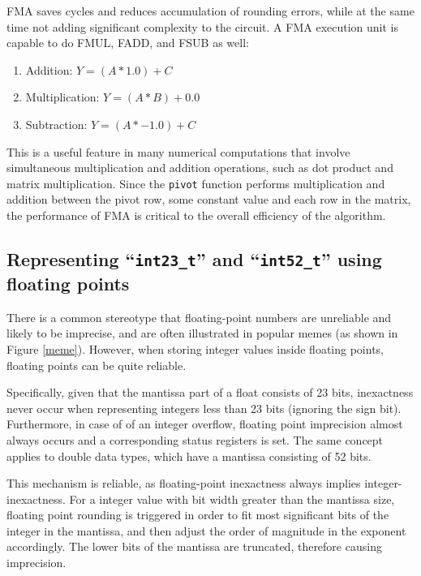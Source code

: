 \documentclass[logo,bsc,singlespacing,parskip]{infthesis}
\newcommand{\pivot}{\texttt{pivot}}
\newenvironment{compactlist}
{ \begin{enumerate}
    \setlength{\itemsep}{0pt}
    \setlength{\parskip}{0pt}
    \setlength{\parsep}{0pt}     
}
{ \end{enumerate} }
\begin{document}
FMA saves cycles and reduces accumulation of rounding errors, while at the same
time not adding significant complexity to the circuit. A FMA execution unit is
capable to do FMUL, FADD, and FSUB as well: 
\begin{compactlist} 
\item[] Addition: \begin{math}Y = (A * 1.0) + C \end{math} 
\item[] Multiplication: \begin{math} Y = (A * B) + 0.0 \end{math} 
\item[] Subtraction: \begin{math} Y = (A * -1.0) + C\end{math} 
\end{compactlist} 

This is a useful feature in many numerical computations that involve
simultaneous multiplication and addition operations, such as dot product and
matrix multiplication. Since the \pivot{} function performs multiplication and
addition between the pivot row, some constant value and each row in the matrix,
the performance of FMA is critical to the overall efficiency of the algorithm. 

\subsection{Representing ``\texttt{int23\_t}'' and ``\texttt{int52\_t}'' using
floating points}
\label{sec:fpe2}

There is a common stereotype that floating-point numbers are unreliable and
likely to be imprecise, and are often illustrated in popular memes (as shown in
Figure \ref{meme}). However, when storing integer values inside floating points, 
floating points can be quite reliable. 

Specifically, given that the mantissa part of a float consists of 23 bits,
inexactness never occur when representing integers less than 23 bits (ignoring
the sign bit). Furthermore, in case of of an integer overflow, floating point
imprecision almost always occurs and a corresponding status registers is set.
The same concept applies to double data types, which have a mantissa consisting
of 52 bits.

This mechanism is reliable, as floating-point inexactness always implies
integer-inexactness. For a integer value with bit width greater than the
mantissa size, floating point rounding is triggered in order to fit most
significant bits of the integer in the mantissa, and then adjust the order of
magnitude in the exponent accordingly. The lower bits of the mantissa are
truncated, therefore causing imprecision. 
\end{document}
